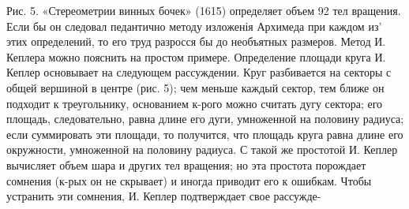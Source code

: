 \documentclass[10pt]{article}
\begin{document}
Рис. 5. «Стереометрии винных бочек» (1615) определяет объем 92 тел вращения. Если бы он следовал педантично методу изложенія Архимеда при каждом из' этих определений, то его труд разросся бы до необъятных размеров. Метод И. Кеплера можно пояснить на простом примере. Определение площади круга И. Кеплер основывает на следующем рассуждении. Круг разбивается на секторы с общей вершиной в центре (рис. 5); чем меньше каждый сектор, тем ближе он подходит к треугольнику, основанием к-рого можно считать дугу сектора; его площадь, следовательно, равна длине его дуги, умноженной на половину радиуса; если суммировать эти площади, то получится, что площадь круга равна длине его окружности, умноженной на половину радиуса. С такой же простотой И. Кеплер вычисляет объем шара и других тел вращения; но эта простота порождает сомнения (к-рых он не скрывает) и иногда приводит его к ошибкам. Чтобы устранить эти сомнения, И. Кеплер подтверждает свое рассужде-
\end{document}
